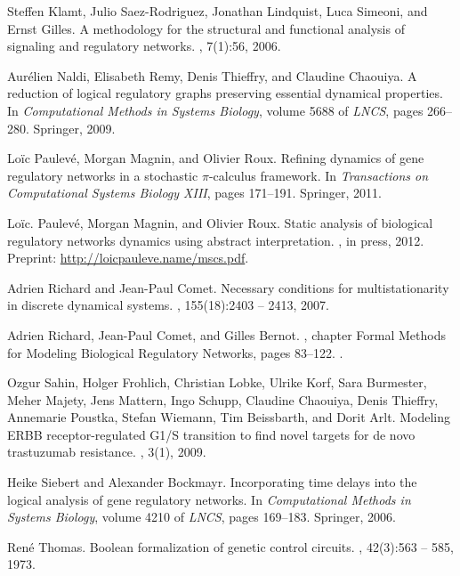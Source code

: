 \documentclass[11pt,a4paper,twoside]{epig}
\newcounter{la}
\begin{document}
\begin{thebibliography}{10}
Steffen Klamt, Julio Saez-Rodriguez, Jonathan Lindquist, Luca Simeoni, and
  Ernst Gilles.
\newblock A methodology for the structural and functional analysis of signaling
  and regulatory networks.
, 7(1):56, 2006.

Aurélien Naldi, Elisabeth Remy, Denis Thieffry, and Claudine Chaouiya.
\newblock A reduction of logical regulatory graphs preserving essential
  dynamical properties.
\newblock In {\em Computational Methods in Systems Biology}, volume 5688 of
  {\em LNCS}, pages 266--280. Springer, 2009.

{L}o{\"i}c {P}aulev{\'e}, {M}organ {M}agnin, and {O}livier {R}oux.
\newblock Refining dynamics of gene regulatory networks in a stochastic
  $\pi$-calculus framework.
\newblock In {\em Transactions on Computational Systems Biology XIII}, pages
  171--191. Springer, 2011.

{L}o{\"i}c. Paulev\'{e}, Morgan Magnin, and Olivier Roux.
\newblock Static analysis of biological regulatory networks dynamics using
  abstract interpretation.
, in press, 2012.
\newblock Preprint: \url{http://loicpauleve.name/mscs.pdf}.

Adrien Richard and Jean-Paul Comet.
\newblock Necessary conditions for multistationarity in discrete dynamical
  systems.
, 155(18):2403 -- 2413, 2007.

Adrien Richard, Jean-Paul Comet, and Gilles Bernot.
, chapter Formal Methods for
  Modeling Biological Regulatory Networks, pages 83--122.
.

Ozgur Sahin, Holger Frohlich, Christian Lobke, Ulrike Korf, Sara Burmester,
  Meher Majety, Jens Mattern, Ingo Schupp, Claudine Chaouiya, Denis Thieffry,
  Annemarie Poustka, Stefan Wiemann, Tim Beissbarth, and Dorit Arlt.
\newblock Modeling {ERBB} receptor-regulated {G}1/{S} transition to find novel
  targets for de novo trastuzumab resistance.
, 3(1), 2009.

Heike Siebert and Alexander Bockmayr.
\newblock Incorporating time delays into the logical analysis of gene
  regulatory networks.
\newblock In {\em Computational Methods in Systems Biology}, volume 4210 of
  {\em LNCS}, pages 169--183. Springer, 2006.

Ren{\'e} Thomas.
\newblock Boolean formalization of genetic control circuits.
, 42(3):563 -- 585, 1973.

\end{thebibliography}
\end{document}
